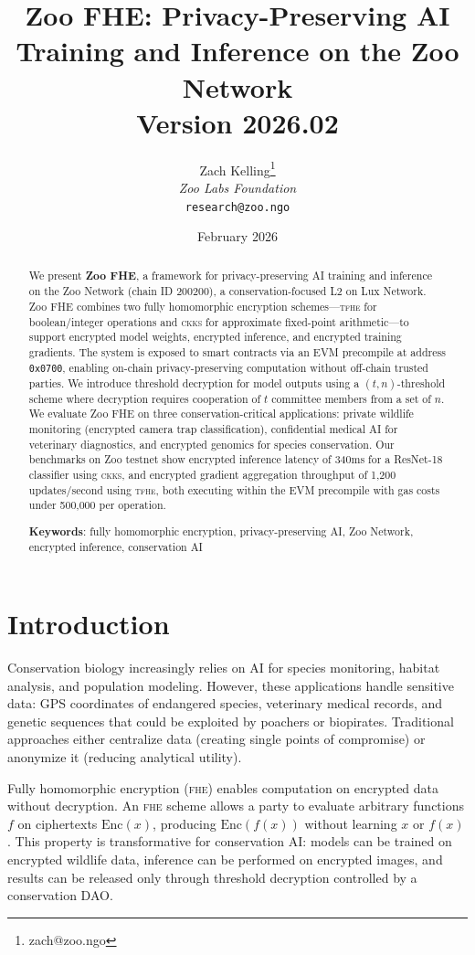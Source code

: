 \documentclass[11pt,letterpaper]{article}
\title{\textbf{Zoo FHE: Privacy-Preserving AI Training and Inference on the Zoo Network}\\
\large Version 2026.02}
\author{
Zach Kelling\thanks{zach@zoo.ngo}\\
\textit{Zoo Labs Foundation}\\
\texttt{research@zoo.ngo}
}
\date{February 2026}
\newcommand{\FHE}{\textsc{fhe}}
\newcommand{\TFHE}{\textsc{tfhe}}
\newcommand{\CKKS}{\textsc{ckks}}
\begin{document}
\zoocoverpage

\begin{abstract}
We present \textbf{Zoo FHE}, a framework for privacy-preserving AI training and inference on the Zoo Network (chain ID 200200), a conservation-focused L2 on Lux Network. Zoo FHE combines two fully homomorphic encryption schemes---\TFHE{} for boolean/integer operations and \CKKS{} for approximate fixed-point arithmetic---to support encrypted model weights, encrypted inference, and encrypted training gradients. The system is exposed to smart contracts via an EVM precompile at address \texttt{0x0700}, enabling on-chain privacy-preserving computation without off-chain trusted parties. We introduce threshold decryption for model outputs using a $(t, n)$-threshold scheme where decryption requires cooperation of $t$ committee members from a set of $n$. We evaluate Zoo FHE on three conservation-critical applications: private wildlife monitoring (encrypted camera trap classification), confidential medical AI for veterinary diagnostics, and encrypted genomics for species conservation. Our benchmarks on Zoo testnet show encrypted inference latency of 340ms for a ResNet-18 classifier using \CKKS{}, and encrypted gradient aggregation throughput of 1,200 updates/second using \TFHE{}, both executing within the EVM precompile with gas costs under 500,000 per operation.

\textbf{Keywords}: fully homomorphic encryption, privacy-preserving AI, Zoo Network, encrypted inference, conservation AI
\end{abstract}

\section{Introduction}

Conservation biology increasingly relies on AI for species monitoring, habitat analysis, and population modeling. However, these applications handle sensitive data: GPS coordinates of endangered species, veterinary medical records, and genetic sequences that could be exploited by poachers or biopirates. Traditional approaches either centralize data (creating single points of compromise) or anonymize it (reducing analytical utility).

Fully homomorphic encryption (\FHE{}) enables computation on encrypted data without decryption. An \FHE{} scheme allows a party to evaluate arbitrary functions $f$ on ciphertexts $\text{Enc}(x)$, producing $\text{Enc}(f(x))$ without learning $x$ or $f(x)$. This property is transformative for conservation AI: models can be trained on encrypted wildlife data, inference can be performed on encrypted images, and results can be released only through threshold decryption controlled by a conservation DAO.
\end{document}
